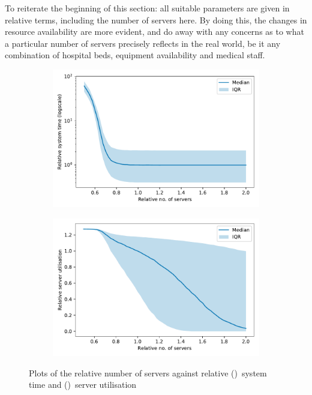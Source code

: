 To reiterate the beginning of this section: all suitable parameters are given in
relative terms, including the number of servers here. By doing this, the changes
in resource availability are more evident, and do away with any concerns as to
what a particular number of servers precisely reflects in the real world, be it
any combination of hospital beds, equipment availability and medical staff.

\begin{figure}
    \centering
    \begin{subfigure}{\imgwidth}
        \includegraphics[width=\linewidth]{servers_time}
        \caption{}\label{fig:servers_time}
    \end{subfigure}

    \begin{subfigure}{\imgwidth}
        \includegraphics[width=\linewidth]{servers_util}
        \caption{}\label{fig:servers_util}
    \end{subfigure}
    \caption{%
        Plots of the relative number of servers against relative
        ()~system time and
        ()~server utilisation
    }\label{fig:servers}
\end{figure}

